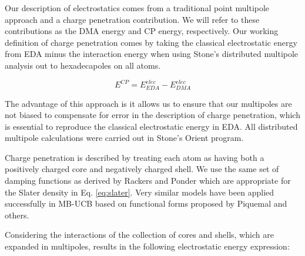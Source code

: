 \documentclass[journal=jacsat,manuscript=article]{achemso}
\begin{document}
Our description of electrostatics comes from a traditional
point multipole approach and a charge penetration contribution. We will refer to
these contributions as the DMA energy and CP energy, respectively.
Our working definition of charge penetration comes by taking the
classical electrostatic energy from EDA minus the interaction energy
when using Stone's distributed multipole analysis\cite{stone1981distributed,stone1985distributeda}
out to hexadecapoles on all atoms.

\begin{equation}
  E^{CP}=E^{elec}_{EDA}-E^{elec}_{DMA}
  \label{eq:cp}
\end{equation}

The advantage of this approach is it allows us to ensure that
our multipoles are not biased to compensate for error in the
description of charge penetration, which is essential to reproduce
the classical electrostatic energy in EDA.
All distributed multipole calculations were carried out
in Stone's Orient program.\cite{stone2002orient}

Charge penetration is described by treating each atom as having both a positively
charged core and negatively charged shell. We use the same set of damping functions
as derived by Rackers and Ponder which are appropriate for the Slater density in Eq. \ref{eq:slater}.\cite{rackers2021polarizable}
Very similar models have been applied successfully in MB-UCB\cite{das2019development}
based on functional forms proposed by Piquemal\cite{piquemal2003improved} and others\cite{wang2015general,rackers2017optimized}.

Considering the interactions of the collection of cores and shells, which are expanded in multipoles,
results in the following electrostatic energy expression:
\end{document}
